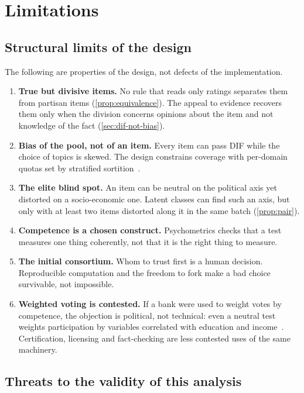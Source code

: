 \section{Limitations}\label{sec:limitations}

\subsection{Structural limits of the design}

The following are properties of the design, not defects of the implementation.
\begin{enumerate}[label=L\arabic*.]
  \item \textbf{True but divisive items.} No rule that reads only ratings separates them from
    partisan items (\cref{prop:equivalence}). The appeal to evidence recovers them only when the
    division concerns opinions about the item and not knowledge of the fact
    (\cref{sec:dif-not-bias}).
  \item \textbf{Bias of the pool, not of an item.} Every item can pass DIF while the choice of
    topics is skewed. The design constrains coverage with per-domain quotas set by stratified
    sortition~\cite{flanigan2021sortition}.
  \item \textbf{The elite blind spot.} An item can be neutral on the political axis yet distorted
    on a socio-economic one. Latent classes can find such an axis, but only with at least two
    items distorted along it in the same batch (\cref{prop:pair}).
  \item \textbf{Competence is a chosen construct.} Psychometrics checks that a test measures one
    thing coherently, not that it is the right thing to measure.
  \item \textbf{The initial consortium.} Whom to trust first is a human decision.
    Reproducible computation and the freedom to fork make a bad choice survivable, not
    impossible.
  \item \textbf{Weighted voting is contested.} If a bank were used to weight votes by
    competence, the objection is political, not technical: even a neutral test weights
    participation by variables correlated with education and income~\cite{brennan2016,estlund2008}.
    Certification, licensing and fact-checking are less contested uses of the same machinery.
\end{enumerate}

\subsection{Threats to the validity of this analysis}

